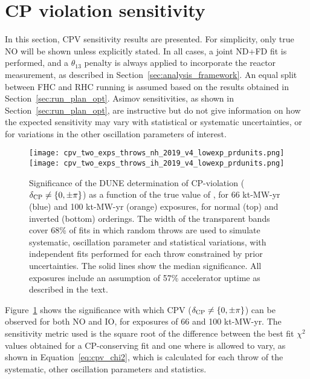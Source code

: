 \FloatBarrier
\section{CP violation sensitivity}
\label{sec:cp_sens}

In this section, CPV sensitivity results are presented. For simplicity, only true NO will be shown unless explicitly stated. In all cases, a joint ND+FD fit is performed, and a $\theta_{13}$ penalty is always applied to incorporate the reactor measurement, as described in Section~\ref{sec:analysis_framework}. An equal split between FHC and RHC running is assumed based on the results obtained in Section~\ref{sec:run_plan_opt}. Asimov sensitivities, as shown in Section~\ref{sec:run_plan_opt}, are instructive but do not give information on how the expected sensitivity may vary with statistical or systematic uncertainties, or for variations in the other oscillation parameters of interest.

\begin{figure}[htbp]
  \centering
  \texttt{[image: cpv\_two\_exps\_throws\_nh\_2019\_v4\_lowexp\_prdunits.png]}\\
  \texttt{[image: cpv\_two\_exps\_throws\_ih\_2019\_v4\_lowexp\_prdunits.png]}
  \caption{Significance of the DUNE determination of CP-violation ($\delta_{\rm CP} \neq \{0,\pm\pi\}$) as a function of the true value of \deltacp, for 66 kt-MW-yr (blue) and 100 kt-MW-yr (orange) exposures, for normal (top) and inverted (bottom) orderings. The width of the transparent bands cover 68\% of fits in which random throws are used to simulate systematic, oscillation parameter and statistical variations, with independent fits performed for each throw constrained by prior uncertainties. The solid lines show the median significance. All exposures include an assumption of 57\% accelerator uptime as described in the text.}
  \label{fig:cpv_bands}
\end{figure}
Figure~\ref{fig:cpv_bands} shows the significance with which CPV ($\delta_{\rm CP} \neq \{0,\pm\pi\}$) can be observed for both NO and IO, for exposures of 66 and 100 kt-MW-yr.  The sensitivity metric used is the square root of the difference between the best fit $\chi^{2}$ values obtained for a CP-conserving fit and one where \deltacp is allowed to vary, as shown in Equation~\ref{eq:cpv_chi2}, which is calculated for each throw of the systematic, other oscillation parameters and statistics. %

